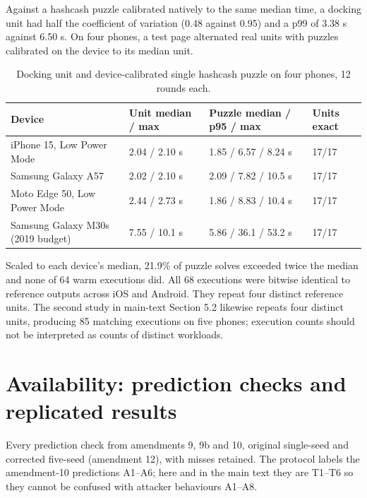 \documentclass[11pt]{article}
\newcommand{\botrule}{\bottomrule}
\begin{document}
Against a hashcash puzzle calibrated natively to the same median time, a docking unit had half the coefficient of variation (0.48 against 0.95) and a p99 of 3.38 s against 6.50 s. On four phones, a test page alternated real units with puzzles calibrated on the device to its median unit.

\begin{table}[htbp]
\caption{Docking unit and device-calibrated single hashcash puzzle on four phones, 12 rounds each.}
\centering
\small
\begin{tabularx}{\textwidth}{XXXX}
\toprule
Device & Unit median / max & Puzzle median / p95 / max & Units exact \\
\midrule
iPhone 15, Low Power Mode & 2.04 / 2.10 s & 1.85 / 6.57 / 8.24 s & 17/17 \\
Samsung Galaxy A57 & 2.02 / 2.10 s & 2.09 / 7.82 / 10.5 s & 17/17 \\
Moto Edge 50, Low Power Mode & 2.44 / 2.73 s & 1.86 / 8.83 / 10.4 s & 17/17 \\
Samsung Galaxy M30s (2019 budget) & 7.55 / 10.1 s & 5.86 / 36.1 / 53.2 s & 17/17 \\
\botrule
\end{tabularx}
\end{table}

Scaled to each device's median, 21.9\% of puzzle solves exceeded twice the median and none of 64 warm executions did. All 68 executions were bitwise identical to reference outputs across iOS and Android. They repeat four distinct reference units. The second study in main-text Section 5.2 likewise repeats four distinct units, producing 85 matching executions on five phones; execution counts should not be interpreted as counts of distinct workloads.

\section{Availability: prediction checks and replicated results}

Every prediction check from amendments 9, 9b and 10, original single-seed and corrected five-seed (amendment 12), with misses retained. The protocol labels the amendment-10 predictions A1--A6; here and in the main text they are T1--T6 so they cannot be confused with attacker behaviours A1--A8.
\end{document}
